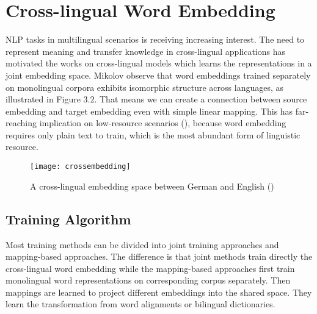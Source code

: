 \section{ Cross-lingual Word Embedding}
 NLP tasks in multilingual scenarios is receiving increasing interest. The need to represent meaning and transfer knowledge in cross-lingual applications has motivated the works on cross-lingual models which learns the representations in a joint embedding space. Mikolov  observe that word embeddings trained separately on monolingual corpora exhibits isomorphic structure across languages, as illustrated in Figure $3.2$. That means we can create a connection between source embedding and target embedding even with simple linear mapping. This has far-reaching implication on low-resource scenarios (\cite{adams2017cross}), because word embedding requires only plain text to train, which is the most abundant form of linguistic resource.
\begin{figure}[t]
	\texttt{[image: crossembedding]}
	\centering
	\caption{A cross-lingual embedding space between German and English (\cite{ruder2017survey})}
\end{figure}

%
%
%
	

\subsection{Training Algorithm}
Most training methods can be divided into joint training approaches and mapping-based approaches. The difference is that joint methods train directly the cross-lingual word embedding while the mapping-based approaches first train monolingual word representations on corresponding corpus separately. Then mappings are learned to project different embeddings into the shared space. They learn the transformation from word alignments or bilingual dictionaries. \\

